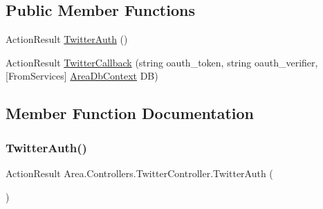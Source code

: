 \subsection*{Public Member Functions}
\begin{DoxyCompactItemize}
\item 
Action\+Result \mbox{\hyperlink{classArea_1_1Controllers_1_1TwitterController_afd0f859da36a880102c7e93f6ce120d8}{Twitter\+Auth}} ()
\item 
Action\+Result \mbox{\hyperlink{classArea_1_1Controllers_1_1TwitterController_a670f3c638f0e9067819f07b59d654cca}{Twitter\+Callback}} (string oauth\+\_\+token, string oauth\+\_\+verifier, \mbox{[}From\+Services\mbox{]} \mbox{\hyperlink{classArea_1_1DAT_1_1AreaDbContext}{Area\+Db\+Context}} DB)
\end{DoxyCompactItemize}


\subsection{Member Function Documentation}
\mbox{\label{classArea_1_1Controllers_1_1TwitterController_afd0f859da36a880102c7e93f6ce120d8}} 
\subsubsection{\texorpdfstring{Twitter\+Auth()}{TwitterAuth()}}
{\footnotesize\ttfamily Action\+Result Area.\+Controllers.\+Twitter\+Controller.\+Twitter\+Auth (\begin{DoxyParamCaption}{ }\end{DoxyParamCaption})\hspace{0.3cm}{\ttfamily [inline]}}

\mbox{\label{classArea_1_1Controllers_1_1TwitterController_a670f3c638f0e9067819f07b59d654cca}} 
